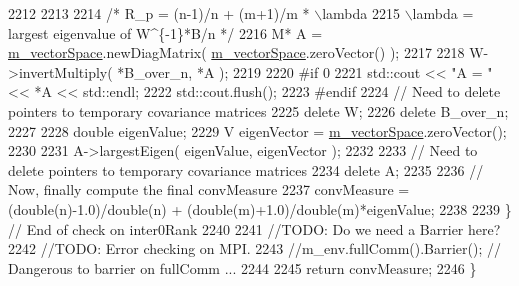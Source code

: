 \begin{DoxyCode}
2212 \textcolor{preprocessor}{}      
2213 
2214       \textcolor{comment}{/* R\_p = (n-1)/n + (m+1)/m * \(\backslash\)lambda}
2215 \textcolor{comment}{   \(\backslash\)lambda = largest eigenvalue of W^\{-1\}*B/n */}
2216       M* A = \hyperlink{class_q_u_e_s_o_1_1_base_vector_sequence_a4bd171e39ed050ff105c808336f35198}{m\_vectorSpace}.newDiagMatrix( \hyperlink{class_q_u_e_s_o_1_1_base_vector_sequence_a4bd171e39ed050ff105c808336f35198}{m\_vectorSpace}.zeroVector() );
2217 
2218       W->invertMultiply( *B\_over\_n, *A );
2219 
2220 \textcolor{preprocessor}{#if 0}
2221 \textcolor{preprocessor}{}      std::cout << \textcolor{stringliteral}{"A = "} << *A << std::endl;
2222       std::cout.flush();
2223 \textcolor{preprocessor}{#endif}
2224 \textcolor{preprocessor}{}      \textcolor{comment}{// Need to delete pointers to temporary covariance matrices}
2225       \textcolor{keyword}{delete} W;
2226       \textcolor{keyword}{delete} B\_over\_n;
2227 
2228       \textcolor{keywordtype}{double} eigenValue;
2229       V eigenVector = \hyperlink{class_q_u_e_s_o_1_1_base_vector_sequence_a4bd171e39ed050ff105c808336f35198}{m\_vectorSpace}.zeroVector(); 
2230 
2231       A->largestEigen( eigenValue, eigenVector );
2232 
2233       \textcolor{comment}{// Need to delete pointers to temporary covariance matrices}
2234       \textcolor{keyword}{delete} A;
2235 
2236       \textcolor{comment}{// Now, finally compute the final convMeasure}
2237       convMeasure = (double(n)-1.0)/double(n) + (double(m)+1.0)/double(m)*eigenValue;
2238 
2239     \} \textcolor{comment}{// End of check on inter0Rank}
2240 
2241   \textcolor{comment}{//TODO: Do we need a Barrier here?}
2242   \textcolor{comment}{//TODO: Error checking on MPI.}
2243   \textcolor{comment}{//m\_env.fullComm().Barrier(); // Dangerous to barrier on fullComm ...}
2244 
2245   \textcolor{keywordflow}{return} convMeasure;
2246 \}
\end{DoxyCode}
